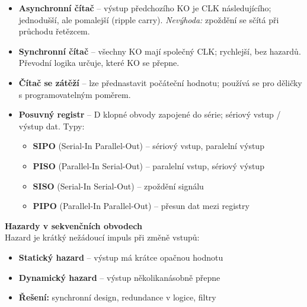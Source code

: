 \documentclass[a4paper,10pt]{article}
\begin{document}
\begin{vysvetlenibox}
\begin{itemize}[noitemsep, leftmargin=1.4em, topsep=4pt]
    \item \textbf{Asynchronní čítač} -- výstup předchozího KO je CLK
          následujícího; jednodušší, ale pomalejší (ripple carry).
          \textit{Nevýhoda:} zpoždění se sčítá při průchodu řetězcem.
    \item \textbf{Synchronní čítač} -- všechny KO mají společný CLK;
          rychlejší, bez hazardů. Převodní logika určuje, které KO se přepne.
    \item \textbf{Čítač se zátěží} -- lze přednastavit počáteční hodnotu;
          používá se pro děličky s programovatelným poměrem.
    \item \textbf{Posuvný registr} -- D klopné obvody zapojené do série;
          sériový vstup / výstup dat. Typy:
          \begin{itemize}[noitemsep, leftmargin=1em]
              \item \textbf{SIPO} (Serial-In Parallel-Out) -- sériový vstup, paralelní výstup
              \item \textbf{PISO} (Parallel-In Serial-Out) -- paralelní vstup, sériový výstup
              \item \textbf{SISO} (Serial-In Serial-Out) -- zpoždění signálu
              \item \textbf{PIPO} (Parallel-In Parallel-Out) -- přesun dat mezi registry
          \end{itemize}
\end{itemize}

\textbf{Hazardy v sekvenčních obvodech}\\
Hazard je krátký nežádoucí impuls při změně vstupů:
\begin{itemize}[noitemsep, leftmargin=1.4em, topsep=4pt]
    \item \textbf{Statický hazard} -- výstup má krátce opačnou hodnotu
    \item \textbf{Dynamický hazard} -- výstup několikanásobně přepne
    \item \textbf{Řešení:} synchronní design, redundance v logice, filtry
\end{itemize}
\end{vysvetlenibox}


\newpage

\end{document}
